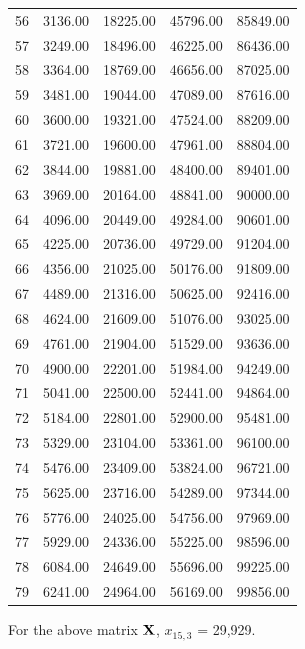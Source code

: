 \documentclass{amsart}
\begin{document}
\begin{table}[ht]
\begin{tabular}{lllll}
  56 & 3136.00 & 18225.00 & 45796.00 & 85849.00 \\
  57 & 3249.00 & 18496.00 & 46225.00 & 86436.00 \\
  58 & 3364.00 & 18769.00 & 46656.00 & 87025.00 \\
  59 & 3481.00 & 19044.00 & 47089.00 & 87616.00 \\
  60 & 3600.00 & 19321.00 & 47524.00 & 88209.00 \\
  61 & 3721.00 & 19600.00 & 47961.00 & 88804.00 \\
  62 & 3844.00 & 19881.00 & 48400.00 & 89401.00 \\
  63 & 3969.00 & 20164.00 & 48841.00 & 90000.00 \\
  64 & 4096.00 & 20449.00 & 49284.00 & 90601.00 \\
  65 & 4225.00 & 20736.00 & 49729.00 & 91204.00 \\
  66 & 4356.00 & 21025.00 & 50176.00 & 91809.00 \\
  67 & 4489.00 & 21316.00 & 50625.00 & 92416.00 \\
  68 & 4624.00 & 21609.00 & 51076.00 & 93025.00 \\
  69 & 4761.00 & 21904.00 & 51529.00 & 93636.00 \\
  70 & 4900.00 & 22201.00 & 51984.00 & 94249.00 \\
  71 & 5041.00 & 22500.00 & 52441.00 & 94864.00 \\
  72 & 5184.00 & 22801.00 & 52900.00 & 95481.00 \\
  73 & 5329.00 & 23104.00 & 53361.00 & 96100.00 \\
  74 & 5476.00 & 23409.00 & 53824.00 & 96721.00 \\
  75 & 5625.00 & 23716.00 & 54289.00 & 97344.00 \\
  76 & 5776.00 & 24025.00 & 54756.00 & 97969.00 \\
  77 & 5929.00 & 24336.00 & 55225.00 & 98596.00 \\
  78 & 6084.00 & 24649.00 & 55696.00 & 99225.00 \\
  79 & 6241.00 & 24964.00 & 56169.00 & 99856.00 \\
   \hline
\end{tabular}
\end{table}

For the above matrix $\bf{X}$, $x_{15, 3}$ = 29,929.
\end{document}
